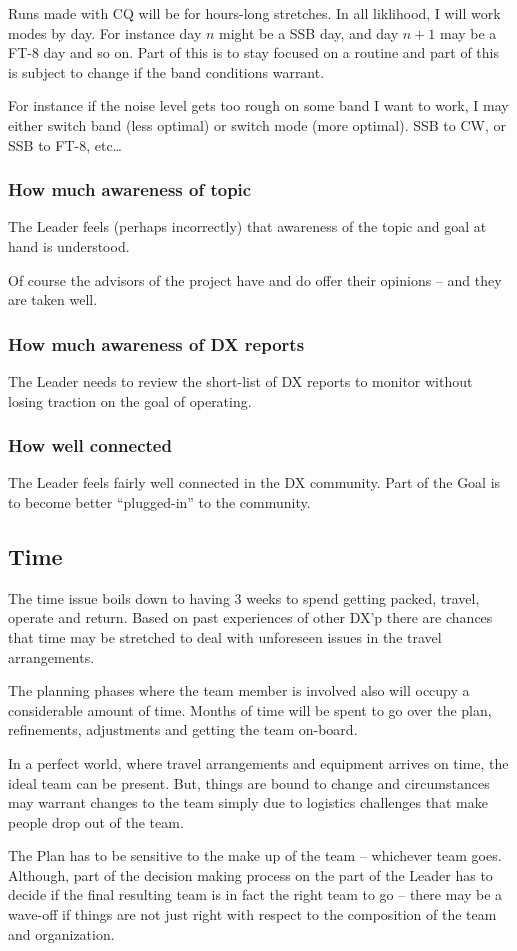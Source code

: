 \documentclass[11pt]{article}
\begin{document}
Runs made with CQ will be for hours-long stretches.   In all liklihood, I will work
modes by day.  For instance day $n$ might be a SSB day, and day $n+1$ may be a FT-8
day and so on.  Part of this is to stay focused on a routine and part of this is
subject to change if the band conditions warrant.  
\par
For instance if the noise level gets too rough on some band I want to work, I may either
switch band (less optimal) or switch mode (more optimal).  SSB to CW,  or SSB to FT-8, 
etc\ldots


\subsubsection{How much awareness of topic}
The Leader feels (perhaps incorrectly) that awareness of the topic and goal at hand
is understood.
\par
Of course the advisors of the project have and do offer their opinions -- and they are
taken well.

\subsubsection{How much awareness of DX reports}

The Leader needs to review the short-list of DX reports to monitor without losing
traction on the goal of operating.

\subsubsection{How well connected}
The Leader feels fairly well connected in the DX community.  Part of the Goal is
to become better ``plugged-in'' to the community.

\subsection{Time}
The time issue boils down to having 3 weeks
to spend getting packed, travel, operate and return.
Based on past experiences of other DX'p there are
chances that time may be stretched to deal with
unforeseen issues in the travel arrangements.
\par
The planning phases where the team member is involved
also will occupy a considerable amount of time.
Months of time will be spent to go over the plan,
refinements, adjustments and getting the team
on-board.
\par
In a perfect world, where travel arrangements
and equipment arrives on time, the ideal team
can be present.  But, things are bound to change
and circumstances may warrant changes to the team
simply due to logistics challenges that make people
drop out of the team.
\par
The Plan has to be sensitive to the make up of the
team -- whichever team goes.  Although, part of
the decision making process on the part of the Leader
has to decide if the final resulting team is in fact
the right team to go -- there may be a wave-off
if things are not just right with respect to the
composition of the team and organization.
\end{document}
